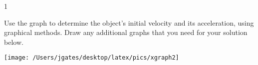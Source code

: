 
\AddToShipoutPicture*{\BackgroundPic}

\addtocounter {ProbNum} {1}

 
{\bf \Large{}} Use the graph to determine the object's initial velocity and its acceleration, using graphical methods. Draw any additional graphs that you need for your solution below.\bigskip

\begin{center}
 \texttt{[image: /Users/jgates/desktop/latex/pics/xgraph2]}
\end{center}

\vfill
\newpage